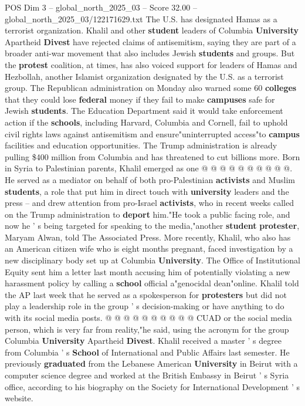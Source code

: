 \begin{textsample}{POS Dim 3 – global\_north\_2025\_03 – Score 32.00 – global\_north\_2025\_03/122171629.txt}
The U.S. has designated Hamas as a terrorist organization.
Khalil and other \textbf{student} leaders of Columbia \textbf{University} Apartheid \textbf{Divest} have rejected claims of antisemitism, saying they are part of a broader anti-war movement that also includes Jewish \textbf{students} and groups.
But the \textbf{protest} coalition, at times, has also voiced support for leaders of Hamas and Hezbollah, another Islamist organization designated by the U.S. as a terrorist group.
The Republican administration on Monday also warned some 60 \textbf{colleges} that they could lose \textbf{federal} money if they fail to make \textbf{campuses} safe for Jewish \textbf{students}.
The Education Department said it would take enforcement action if the \textbf{schools}, including Harvard, Columbia and Cornell, fail to uphold civil rights laws against antisemitism and ensure"uninterrupted access"to \textbf{campus} facilities and education opportunities.
The Trump administration is already pulling \$400 million from Columbia and has threatened to cut billions more.
Born in Syria to Palestinian parents, Khalil emerged as one @ @ @ @ @ @ @ @ @ @.
He served as a mediator on behalf of both pro-Palestinian \textbf{activists} and Muslim \textbf{students}, a role that put him in direct touch with \textbf{university} leaders and the press -- and drew attention from pro-Israel \textbf{activists}, who in recent weeks called on the Trump administration to \textbf{deport} him."He took a public facing role, and now he ' s being targeted for speaking to the media,"another \textbf{student} \textbf{protester}, Maryam Alwan, told The Associated Press.
More recently, Khalil, who also has an American citizen wife who is eight months pregnant, faced investigation by a new disciplinary body set up at Columbia \textbf{University}.
The Office of Institutional Equity sent him a letter last month accusing him of potentially violating a new harassment policy by calling a \textbf{school} official a"genocidal dean"online.
Khalil told the AP last week that he served as a spokesperson for \textbf{protesters} but did not play a leadership role in the group ' s decision-making or have anything to do with its social media posts. @ @ @ @ @ @ @ @ @ @ CUAD or the social media person, which is very far from reality,"he said, using the acronym for the group Columbia \textbf{University} Apartheid \textbf{Divest}.
Khalil received a master ' s degree from Columbia ' s \textbf{School} of International and Public Affairs last semester.
He previously \textbf{graduated} from the Lebanese American \textbf{University} in Beirut with a computer science degree and worked at the British Embassy in Beirut ' s Syria office, according to his biography on the Society for International Development ' s website.

\end{textsample}
